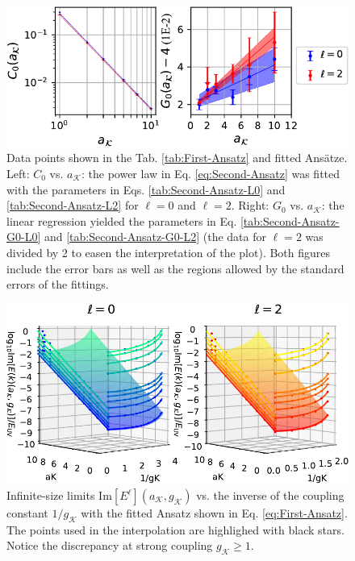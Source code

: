 \documentclass[english,aps,prd,nofootinbib,twocolumn]{revtex4-1}
\begin{document}
\begin{figure}
\centering
\includegraphics[scale=0.70]{./PlotReport/PlotC0G0.pdf}
\caption{Data points shown in the Tab. \ref{tab:First-Ansatz} and fitted Ans\"{a}tze. Left: $C_{0}$ vs. $a_{\mathcal{K}}$: the power law in Eq. \eqref{eq:Second-Ansatz} was fitted with the parameters in Eqs. \eqref{tab:Second-Ansatz-L0} and \eqref{tab:Second-Ansatz-L2} for $\ell=0$ and $\ell=2$. Right: $G_{0}$ vs. $a_{\mathcal{K}}$: the linear regression yielded the parameters in Eq. \eqref{tab:Second-Ansatz-G0-L0} and \eqref{tab:Second-Ansatz-G0-L2} (the data for $\ell=2$ was divided by 2 to easen the interpretation of the plot). Both figures include the error bars as well as the regions allowed by the standard errors of the fittings.}
\label{fig:Second-Ansatz}
\end{figure}

\begin{figure}
\centering
\includegraphics[scale=0.8]{./PlotReport/ThirdAnsatz.pdf}
\caption{Infinite-size limits $\mathrm{Im}[E^{\ell}](a_{\mathcal{K}},g_{\mathcal{K}})$ vs. the inverse of the coupling constant $1/g_{\mathcal{K}}$ with the fitted Ansatz shown in Eq. \eqref{eq:First-Ansatz}. The points used in the interpolation are highlighed with black stars. Notice the discrepancy at strong coupling $g_{\mathcal{K}}\geq 1$.}
\label{fig:Third-Ansatz}
\end{figure}
\end{document}
